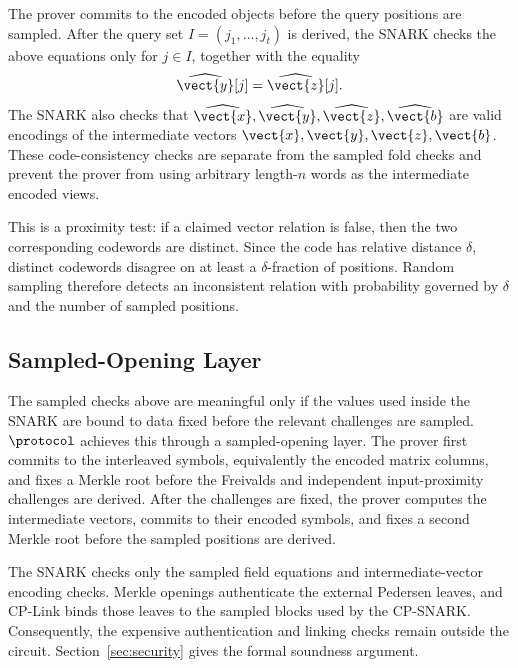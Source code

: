 The prover commits to the encoded objects before the query positions are
sampled.  After the query set \(I=(j_1,\ldots,j_t)\) is derived, the SNARK
checks the above equations only for \(j\in I\), together with the equality
\[
  \widehat{\vect{y}}[j]=\widehat{\vect{z}}[j].
\]
The SNARK also checks that
\(\widehat{\vect{x}},\widehat{\vect{y}},\widehat{\vect{z}},
\widehat{\vect{b}}\) are valid
encodings of the intermediate vectors
\(\vect{x},\vect{y},\vect{z},\vect{b}\). These code-consistency checks are separate from
the sampled fold checks and prevent the prover from using arbitrary length-\(n\)
words as the intermediate encoded views.

This is a proximity test: if a claimed vector relation is false, then the two
corresponding codewords are distinct.  Since the code has relative distance
\(\delta\), distinct codewords disagree on at least a \(\delta\)-fraction of
positions.  Random sampling therefore detects an inconsistent relation with
probability governed by \(\delta\) and the number of sampled positions.

\subsection{Sampled-Opening Layer}
\label{sec:overview-commit-link}

The sampled checks above are meaningful only if the values used inside the
SNARK are bound to data fixed before the relevant challenges are sampled.
\(\protocol\) achieves this through a sampled-opening layer.
The prover first commits to the interleaved symbols, equivalently the encoded
matrix columns, and fixes a Merkle root before the Freivalds and independent
input-proximity challenges are derived.  After the challenges are fixed, the prover computes the intermediate
vectors, commits to their encoded symbols, and fixes a second Merkle root before
the sampled positions are derived.

The SNARK checks only the sampled field equations and intermediate-vector
encoding checks.  Merkle openings authenticate the external Pedersen leaves,
and CP-Link binds those leaves to the sampled blocks used by the CP-SNARK.
Consequently, the expensive authentication and linking checks remain outside
the circuit.  Section~\ref{sec:security} gives the formal soundness argument.
